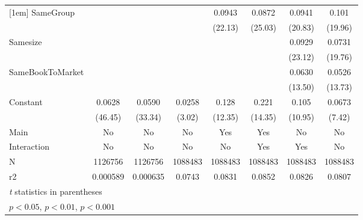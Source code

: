 {\begin{tabular}{l*{7}{c}}
[1em]
SameGroup           &                     &                     &                     &      0.0943\sym{***}&      0.0872\sym{***}&      0.0941\sym{***}&       0.101\sym{***}\\
                    &                     &                     &                     &     (22.13)         &     (25.03)         &     (20.83)         &     (19.96)         \\
[1em]
Samesize            &                     &                     &                     &                     &                     &      0.0929\sym{***}&      0.0731\sym{***}\\
                    &                     &                     &                     &                     &                     &     (23.12)         &     (19.76)         \\
[1em]
SameBookToMarket    &                     &                     &                     &                     &                     &      0.0630\sym{***}&      0.0526\sym{***}\\
                    &                     &                     &                     &                     &                     &     (13.50)         &     (13.73)         \\
[1em]
Constant            &      0.0628\sym{***}&      0.0590\sym{***}&      0.0258\sym{**} &       0.128\sym{***}&       0.221\sym{***}&       0.105\sym{***}&      0.0673\sym{***}\\
                    &     (46.45)         &     (33.34)         &      (3.02)         &     (12.35)         &     (14.35)         &     (10.95)         &      (7.42)         \\
\hline
Main                &          No         &          No         &          No         &         Yes         &         Yes         &          No         &          No         \\
Interaction         &          No         &          No         &          No         &          No         &         Yes         &         Yes         &          No         \\
N                   &     1126756         &     1126756         &     1088483         &     1088483         &     1088483         &     1088483         &     1088483         \\
r2                  &    0.000589         &    0.000635         &      0.0743         &      0.0831         &      0.0852         &      0.0826         &      0.0807         \\
\hline\hline
\multicolumn{8}{l}{\footnotesize \textit{t} statistics in parentheses}\\
\multicolumn{8}{l}{\footnotesize \sym{*} \(p<0.05\), \sym{**} \(p<0.01\), \sym{***} \(p<0.001\)}\\
\end{tabular}
}
